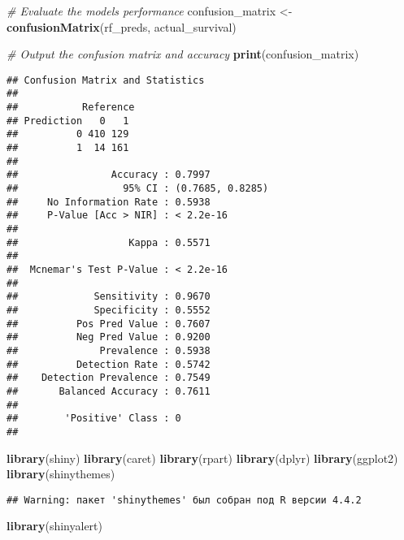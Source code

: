 \documentclass[
]{article}
\newenvironment{Shaded}{\begin{snugshade}}{\end{snugshade}}
\newcommand{\CommentTok}[1]{\textcolor[rgb]{0.56,0.35,0.01}{\textit{#1}}}
\newcommand{\FunctionTok}[1]{\textcolor[rgb]{0.13,0.29,0.53}{\textbf{#1}}}
\newcommand{\NormalTok}[1]{#1}
\newcommand{\OtherTok}[1]{\textcolor[rgb]{0.56,0.35,0.01}{#1}}
\begin{document}
\begin{Shaded}
\begin{Highlighting}[]
\CommentTok{\# Evaluate the model\textquotesingle{}s performance}
\NormalTok{confusion\_matrix }\OtherTok{\textless{}{-}} \FunctionTok{confusionMatrix}\NormalTok{(rf\_preds, actual\_survival)}

\CommentTok{\# Output the confusion matrix and accuracy}
\FunctionTok{print}\NormalTok{(confusion\_matrix)}
\end{Highlighting}
\end{Shaded}

\begin{verbatim}
## Confusion Matrix and Statistics
## 
##           Reference
## Prediction   0   1
##          0 410 129
##          1  14 161
##                                           
##                Accuracy : 0.7997          
##                  95% CI : (0.7685, 0.8285)
##     No Information Rate : 0.5938          
##     P-Value [Acc > NIR] : < 2.2e-16       
##                                           
##                   Kappa : 0.5571          
##                                           
##  Mcnemar's Test P-Value : < 2.2e-16       
##                                           
##             Sensitivity : 0.9670          
##             Specificity : 0.5552          
##          Pos Pred Value : 0.7607          
##          Neg Pred Value : 0.9200          
##              Prevalence : 0.5938          
##          Detection Rate : 0.5742          
##    Detection Prevalence : 0.7549          
##       Balanced Accuracy : 0.7611          
##                                           
##        'Positive' Class : 0               
## 
\end{verbatim}

\begin{Shaded}
\begin{Highlighting}[]
\FunctionTok{library}\NormalTok{(shiny)}
\FunctionTok{library}\NormalTok{(caret)}
\FunctionTok{library}\NormalTok{(rpart)}
\FunctionTok{library}\NormalTok{(dplyr)}
\FunctionTok{library}\NormalTok{(ggplot2)}
\FunctionTok{library}\NormalTok{(shinythemes)}
\end{Highlighting}
\end{Shaded}

\begin{verbatim}
## Warning: пакет 'shinythemes' был собран под R версии 4.4.2
\end{verbatim}

\begin{Shaded}
\begin{Highlighting}[]
\FunctionTok{library}\NormalTok{(shinyalert)}
\end{Highlighting}
\end{Shaded}
\end{document}
